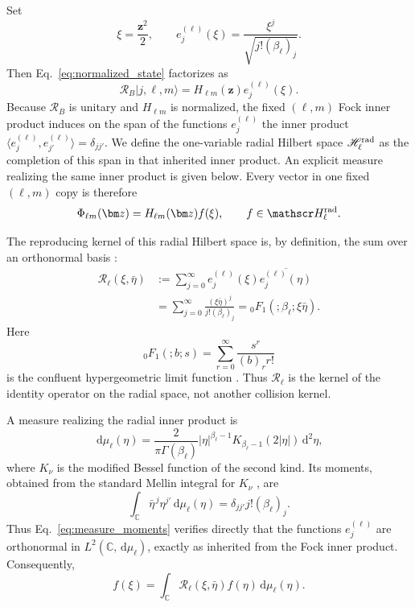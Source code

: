 \documentclass[11pt]{article}
\numberwithin{equation}{section}
\newcommand{\C}{\mathbb C}
\newcommand{\dd}{\,\mathrm d}
\theoremstyle{definition}
\begin{document}
Set
\begin{equation}
 \xi=\frac{\bm z^2}{2},
 \qquad
 e_j^{(\ell)}(\xi)
 =\frac{\xi^j}{\sqrt{j!(\beta_\ell)_j}}.
 \label{eq:radial_basis_def}
\end{equation}
Then Eq.~\eqref{eq:normalized_state} factorizes as
\begin{equation}
 \mathcal R_B|j,\ell,m\rangle
 =H_{\ell m}(\bm z)e_j^{(\ell)}(\xi).
 \label{eq:radial_basis}
\end{equation}
Because $\mathcal R_B$ is unitary and $H_{\ell m}$ is normalized, the fixed
$(\ell,m)$ Fock inner product induces on the span of the functions
$e_j^{(\ell)}$ the inner product
$\langle e_j^{(\ell)},e_{j'}^{(\ell)}\rangle=\delta_{jj'}$.  We define the
one-variable radial Hilbert space $\mathscr H_\ell^{\rm rad}$ as the completion
of this span in that inherited inner product.  An explicit measure realizing
the same inner product is given below.  Every vector in one fixed $(\ell,m)$ copy is
therefore
\begin{equation}
 \Phi_{\ell m}(\bm z)=H_{\ell m}(\bm z)f(\xi),
 \qquad f\in\mathscr H_\ell^{\rm rad}.
\end{equation}

The reproducing kernel of this radial Hilbert space is, by definition, the
sum over an orthonormal basis \cite{Aronszajn1950}:
\begin{align}
 \mathscr R_\ell(\xi,\bar\eta)
 &:={}
 \sum_{j=0}^\infty
 e_j^{(\ell)}(\xi)\overline{e_j^{(\ell)}(\eta)}
 \nonumber\\
 &=\sum_{j=0}^\infty
 \frac{(\xi\bar\eta)^j}{j!(\beta_\ell)_j}
 ={}_0F_1(;\beta_\ell;\xi\bar\eta).
 \label{eq:radial_RK}
\end{align}
Here
\begin{equation}
 {}_0F_1(;b;s)
 =\sum_{r=0}^{\infty}\frac{s^r}{(b)_r r!}
 \label{eq:0F1_definition_main}
\end{equation}
is the confluent hypergeometric limit function \cite{NIST2010}.  Thus
$\mathscr R_\ell$ is the kernel of the identity operator on the radial space,
not another collision kernel.

A measure realizing the radial inner product is
\begin{equation}
 \dd\mu_\ell(\eta)
 =
 \frac{2}{\pi\Gamma(\beta_\ell)}
 |\eta|^{\beta_\ell-1}
 K_{\beta_\ell-1}(2|\eta|)\dd^2\eta,
 \label{eq:radial_measure}
\end{equation}
where $K_\nu$ is the modified Bessel function of the second kind.  Its moments, obtained from the standard Mellin integral for $K_\nu$ \cite{NIST2010},
are
\begin{equation}
 \int_{\C}\bar\eta^{\,j}\eta^{j'}\dd\mu_\ell(\eta)
 =\delta_{jj'}j!(\beta_\ell)_j.
 \label{eq:measure_moments}
\end{equation}
Thus Eq.~\eqref{eq:measure_moments} verifies directly that the functions
$e_j^{(\ell)}$ are orthonormal in $L^2(\C,\dd\mu_\ell)$, exactly as inherited
from the Fock inner product.  Consequently,
\begin{equation}
 f(\xi)
 =\int_{\C}\mathscr R_\ell(\xi,\bar\eta)f(\eta)\dd\mu_\ell(\eta).
 \label{eq:radial_reproducing_property}
\end{equation}
\end{document}
